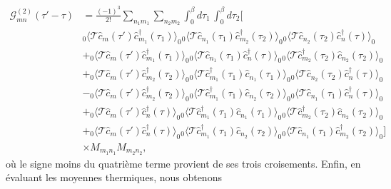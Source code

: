 \begin{align}
    \mathcal{G}^{(2)}_{mn}(\tau'-\tau) &= \frac{(-1)^3}{2!}\sum_{n_1m_1}\sum_{n_2m_2}\int_0^\beta d\tau_1\,\int_0^\beta d\tau_2\Big[\nonumber\\
    &{}_0\langle\mathcal{T}\hat{c}_{m}(\tau')\hat{c}_{m_1}^\dag(\tau_1)\rangle_0{}_0\langle\mathcal{T}\hat{c}_{n_1}(\tau_1)\hat{c}_{m_2}^\dag(\tau_2)\rangle_0{}_0\langle\mathcal{T}\hat{c}_{n_2}(\tau_2)\hat{c}_{n}^\dag(\tau)\rangle_0\nonumber\\
    &+{}_0\langle\mathcal{T}\hat{c}_{m}(\tau')\hat{c}_{m_1}^\dag(\tau_1)\rangle_0{}_0\langle\mathcal{T}\hat{c}_{n_1}(\tau_1)\hat{c}_{n}^\dag(\tau)\rangle_0{}_0\langle\mathcal{T}\hat{c}_{m_2}^\dag(\tau_2)\hat{c}_{n_2}(\tau_2)\rangle_0\nonumber\\
    &+{}_0\langle\mathcal{T}\hat{c}_{m}(\tau')\hat{c}_{m_2}^\dag(\tau_2)\rangle_0{}_0\langle\mathcal{T}\hat{c}_{m_1}^\dag(\tau_1)\hat{c}_{n_1}(\tau_1)\rangle_0{}_0\langle\mathcal{T}\hat{c}_{n_2}(\tau_2)\hat{c}_{n}^\dag(\tau)\rangle_0\nonumber\\
    &-{}_0\langle\mathcal{T}\hat{c}_{m}(\tau')\hat{c}_{m_2}^\dag(\tau_2)\rangle_0{}_0\langle\mathcal{T}\hat{c}_{m_1}^\dag(\tau_1)\hat{c}_{n_2}(\tau_2)\rangle_0{}_0\langle\mathcal{T}\hat{c}_{n_1}(\tau_1)\hat{c}_{n}^\dag(\tau)\rangle_0\nonumber\\
    &+{}_0\langle\mathcal{T}\hat{c}_{m}(\tau')\hat{c}_{n}^\dag(\tau)\rangle_0{}_0\langle\mathcal{T}\hat{c}_{m_1}^\dag(\tau_1)\hat{c}_{n_1}(\tau_1)\rangle_0{}_0\langle\mathcal{T}\hat{c}_{m_2}^\dag(\tau_2)\hat{c}_{n_2}(\tau_2)\rangle_0\nonumber\\
    &+{}_0\langle\mathcal{T}\hat{c}_{m}(\tau')\hat{c}_{n}^\dag(\tau)\rangle_0{}_0\langle\mathcal{T}\hat{c}_{m_1}^\dag(\tau_1)\hat{c}_{n_2}(\tau_2)\rangle_0{}_0\langle\mathcal{T}\hat{c}_{n_1}(\tau_1)\hat{c}_{m_2}^\dag(\tau_2)\rangle_0\Big]\nonumber\\
    &\times M_{m_1n_1}M_{m_2n_2},
\end{align}
où le signe moins du quatrième terme provient de ses trois croisements. Enfin, en évaluant les moyennes thermiques, nous obtenons
